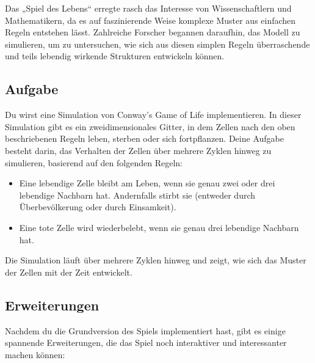 \documentclass[12pt,a4paper]{article}
\begin{document}
Das „Spiel des Lebens“ erregte rasch das Interesse von Wissenschaftlern und Mathematikern, da es auf faszinierende Weise komplexe Muster aus einfachen Regeln entstehen lässt. Zahlreiche Forscher begannen daraufhin, das Modell zu simulieren, um zu untersuchen, wie sich aus diesen simplen Regeln überraschende und teils lebendig wirkende Strukturen entwickeln können.

\subsection{Aufgabe}

Du wirst eine Simulation von Conway's Game of Life implementieren. In dieser Simulation gibt es ein zweidimensionales Gitter, in dem Zellen nach den oben beschriebenen Regeln leben, sterben oder sich fortpflanzen. Deine Aufgabe besteht darin, das Verhalten der Zellen über mehrere Zyklen hinweg zu simulieren, basierend auf den folgenden Regeln:

\begin{itemize}
    \item Eine lebendige Zelle bleibt am Leben, wenn sie genau zwei oder drei lebendige Nachbarn hat. Andernfalls stirbt sie (entweder durch Überbevölkerung oder durch Einsamkeit).
    \item Eine tote Zelle wird wiederbelebt, wenn sie genau drei lebendige Nachbarn hat.
\end{itemize}

Die Simulation läuft über mehrere Zyklen hinweg und zeigt, wie sich das Muster der Zellen mit der Zeit entwickelt.

\bigskip

\subsection{Erweiterungen}

Nachdem du die Grundversion des Spiels implementiert hast, gibt es einige spannende Erweiterungen, die das Spiel noch interaktiver und interessanter machen können:
\end{document}
